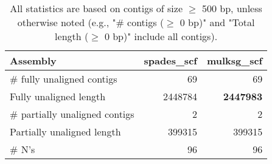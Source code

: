 \documentclass[12pt,a4paper]{article}
\begin{document}
\begin{table}[ht]
\begin{center}
\caption{All statistics are based on contigs of size $\geq$ 500 bp, unless otherwise noted (e.g., "\# contigs ($\geq$ 0 bp)" and "Total length ($\geq$ 0 bp)" include all contigs).}
\begin{tabular}{|l*{2}{|r}|}
\hline
Assembly & spades\_scf & mulksg\_scf \\ \hline
\# fully unaligned contigs & 69 & 69 \\ \hline
Fully unaligned length & 2448784 & {\bf 2447983} \\ \hline
\# partially unaligned contigs & 2 & 2 \\ \hline
Partially unaligned length & 399315 & 399315 \\ \hline
\# N's & 96 & 96 \\ \hline
\end{tabular}
\end{center}
\end{table}
\end{document}

